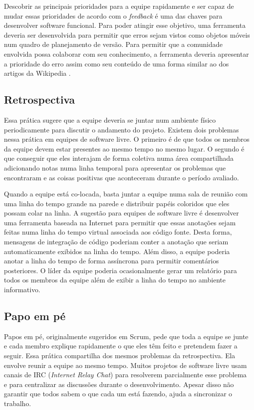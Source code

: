 Descobrir as principais prioridades para a equipe rapidamente e ser
capaz de mudar essas prioridades de acordo com o \emph{feedback} é uma
das chaves para desenvolver software funcional. Para poder atingir
esse objetivo, uma ferramenta deveria ser desenvolvida para permitir
que erros sejam vistos como objetos móveis num quadro de planejamento
de versão. Para permitir que a comunidade envolvida possa colaborar
com seu conhecimento, a ferramenta deveria apresentar a prioridade do
erro assim como seu conteúdo de uma forma similar ao dos artigos da
Wikipedia \cite{Surowiecki2004,Tapscott2006,Benkler2006}.

\subsection{Retrospectiva}
\label{subsec:retrospect}

Essa prática sugere que a equipe deveria se juntar num ambiente físico
periodicamente para discutir o andamento do projeto. Existem dois
problemas nessa prática em equipes de software livre. O primeiro é de
que todos os membros da equipe devem estar presentes ao mesmo tempo no
mesmo lugar. O segundo é que conseguir que eles interajam de forma
coletiva numa área compartilhada adicionando notas numa linha temporal
para apresentar os problemas que encontraram e as coisas positivas que
aconteceram durante o período avaliado.

Quando a equipe está co-locada, basta juntar a equipe numa sala de
reunião com uma linha do tempo grande na parede e distribuir papéis
coloridos que eles possam colar na linha. A sugestão para equipes de
software livre é desenvolver uma ferramenta baseada na Internet para
permitir que essas anotações sejam feitas numa linha do tempo virtual
associada aos código fonte. Desta forma, mensagens de integração de
código poderiam conter a anotação que seriam automaticamente exibidos
na linha do tempo. Além disso, a equipe poderia anotar a linha do
tempo de forma assíncrona para permitir comentários posteriores. O
líder da equipe poderia ocasionalmente gerar um relatório para todos
os membros da equipe além de exibir a linha do tempo no ambiente
informativo.

\subsection{Papo em pé}
\label{subsec:stand-up}

Papos em pé, originalmente sugeridos em Scrum, pede que toda a equipe
se junte e cada membro explique rapidamente o que eles têm feito e
pretendem fazer a seguir. Essa prática compartilha dos mesmos
problemas da retrospectiva. Ela envolve reunir a equipe ao mesmo
tempo. Muitos projetos de software livre usam canais de IRC
(\emph{Internet Relay Chat}) para resolverem parcialmente esse
problema e para centralizar as discussões durante o
desenvolvimento. Apesar disso não garantir que todos sabem o que cada
um está fazendo, ajuda a sincronizar o trabalho.

